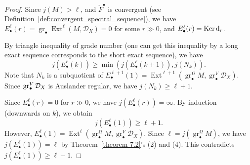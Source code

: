 \begin{proof}
    Since $j(M)>\ell$, and $\check{F}^\bullet$ is convergent (see Definition~\ref{def:convergent_spectral_sequence}),
    we have $E_{\bullet}^{\ell}(r) = \operatorname{gr}_{\bullet} \operatorname{Ext}^{\ell}(M, \mathcal{D}_X) = 0$ for some $r\gg 0$,
    and $E^{\ell}_{\bullet}(r)=\operatorname{Ker} \mathrm{d}_{r}$.

    By triangle inequality of grade number (one can get this inequality by a long exact sequence corresponds to the short exact sequence), we have
    \[
        j(E_{\bullet}^{\ell}(k)) \ge \min(j(E_{\bullet}^{\ell}(k+1)), j(N_k)).
    \]
    Note that $N_k$ is a subquotient of $E_{\bullet}^{\ell+1}(1) = \operatorname{Ext}^{\ell+1}(\operatorname{gr}_{\bullet}^{\Omega} M, \operatorname{gr}^{V}_{\bullet}\mathcal{D}_X)$.
    Since $\operatorname{gr}_\bullet^{V}\mathcal{D}_X$ is Auslander regular, we have $j(N_k) \ge \ell+1$.

    Since $E_{\bullet}^{\ell}(r) = 0$ for $r \gg 0$, we have $j(E_{\bullet}^{\ell}(r)) = \infty$.
    By induction (downwards on $k$), we obtain
    \[
        j(E_{\bullet}^{\ell}(1)) \ge \ell+1.
    \]
    However, $E_{\bullet}^{\ell}(1) = \operatorname{Ext}^{\ell}(\operatorname{gr}_{\bullet}^{\Omega} M, \operatorname{gr}^{V}_{\bullet}\mathcal{D}_X)$.
    Since $\ell = j(\operatorname{gr}_{\bullet}^{\Omega} M)$, we have $j(E_{\bullet}^{\ell}(1)) = \ell$ by Theorem~\ref{theorem 7.2}'s (2) and (4).
    This contradicts $j(E_{\bullet}^{\ell}(1)) \ge \ell+1$.
\end{proof}

